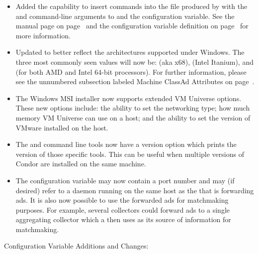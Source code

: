 \begin{itemize}

\item Added the capability to insert commands into the 
  file produced by  with the  and
   command-line arguments to  and
  the  configuration variable.
  See the  manual page on
  page~\pageref{man-condor-submit-dag}
  and the configuration variable definition on
  page~\pageref{param:DAGManInsertSubFile} for more information.

\item Updated  to better reflect the architectures supported 
      under Windows. The three most commonly seen values will now be: 
       (aka x68),  (Intel Itanium), and 
       (for both AMD and Intel 64-bit processors).
      For further information, please see the unnumbered subsection 
      labeled Machine ClassAd Attributes on 
      page~\pageref{sec:Machine-ClassAd-Attributes}.

\item The Windows MSI installer now supports extended VM Universe 
      options. These new options include: the ability to set the 
      networking type; how much memory VM Universe can use on a host; 
      and the ability to set the version of VMware installed on the host.

\item The  and  command line tools now have a
version option which prints the version of those specific tools.  This
can be useful when multiple versions of Condor are installed on the
same machine.

\item The configuration variable  may now
contain a port number and may (if desired) refer to a
 daemon running on the same host as the
 that is forwarding ads.  It is also now possible to
use the forwarded ads for matchmaking purposes.  For example, several
collectors could forward ads to a single aggregating collector which
a  then uses as its source of information for
matchmaking.

\end{itemize}

\noindent Configuration Variable Additions and Changes:

